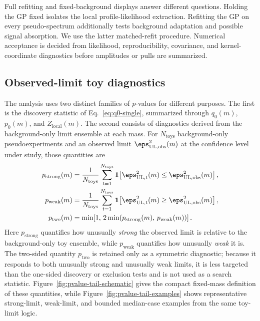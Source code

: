 Full refitting and fixed-background displays answer different questions. Holding the GP
fixed isolates the local profile-likelihood extraction.  Refitting the GP on every
pseudo-spectrum additionally tests background adaptation and possible signal
absorption. We use the latter matched-refit procedure. Numerical acceptance is decided
from likelihood, reproducibility, covariance, and kernel-coordinate diagnostics before
amplitudes or pulls are summarized.

\subsection{Observed-limit toy diagnostics}

The analysis uses two distinct families of $p$-values for different purposes. The
first is the discovery statistic of
Eq.~\eqref{eq:q0-single}, summarized through $q_0(m)$, $p_0(m)$, and
$Z_{\mathrm{local}}(m)$. The second consists of diagnostics
derived from the background-only \CLs{} limit ensemble at each mass. For
$N_{\mathrm{toys}}$ background-only pseudoexperiments and an observed limit
$\eps^2_{\mathrm{UL},\mathrm{obs}}(m)$ at the confidence level under study, those
quantities are
\begin{align}
p_{\mathrm{strong}}(m)
&=
\frac{1}{N_{\mathrm{toys}}}
\sum_{t=1}^{N_{\mathrm{toys}}}
\mathbf{1}\!\left[
\eps^2_{\mathrm{UL},t}(m)\le \eps^2_{\mathrm{UL},\mathrm{obs}}(m)
\right], \\
p_{\mathrm{weak}}(m)
&=
\frac{1}{N_{\mathrm{toys}}}
\sum_{t=1}^{N_{\mathrm{toys}}}
\mathbf{1}\!\left[
\eps^2_{\mathrm{UL},t}(m)\ge \eps^2_{\mathrm{UL},\mathrm{obs}}(m)
\right], \\
p_{\mathrm{two}}(m)
&=
\min\!\left[1,\,
2\min\!\left(p_{\mathrm{strong}}(m),\,p_{\mathrm{weak}}(m)\right)\right].
\end{align}
Here $p_{\mathrm{strong}}$ quantifies how unusually \emph{strong} the observed limit
is relative to the background-only toy ensemble, while $p_{\mathrm{weak}}$ quantifies
how unusually \emph{weak} it is. The two-sided quantity $p_{\mathrm{two}}$ is retained
only as a symmetric diagnostic; because it responds to both unusually strong
and unusually weak limits, it is less targeted than the one-sided discovery or
exclusion tests and is not used as a search statistic. Figure~\ref{fig:pvalue-tail-schematic}
gives the compact fixed-mass definition of these quantities, while
Figure~\ref{fig:pvalue-tail-examples} shows representative strong-limit, weak-limit,
and bounded median-case examples from the same toy-limit logic.

